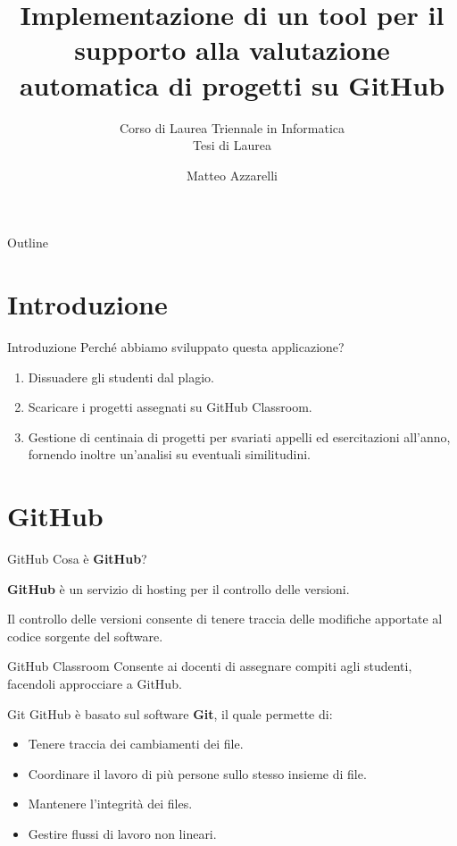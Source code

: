 \documentclass{beamer}
\title{Implementazione di un tool per il supporto alla valutazione automatica di progetti su GitHub}
\subtitle{\vspace{-0cm}Corso di Laurea Triennale in Informatica\\{\large Tesi di Laurea}}
\author{%
	Matteo Azzarelli}
\date{\vspace{2.5cm}\color{black}{\footnotesize{ANNO ACCADEMICO 2017/2018}}}
\begin{document}
	\maketitle

	\begin{frame}{Outline}
		\tableofcontents
	\end{frame}

	\section{Introduzione}
	
	\begin{frame}{Introduzione}
		Perché abbiamo sviluppato questa applicazione?
		\pause
		\begin{enumerate}[<+->]
			\item Dissuadere gli studenti dal plagio.
			\item Scaricare i progetti assegnati su GitHub Classroom.
			\item Gestione di centinaia di progetti per svariati appelli ed esercitazioni all'anno, fornendo inoltre un'analisi su eventuali similitudini.
			
		\end{enumerate}
	\end{frame}

	\section{GitHub}
	
	\begin{frame}{GitHub}
		Cosa è \textbf{GitHub}?
		
		\vspace{0.5cm}
		\textbf{GitHub} è un servizio di hosting per il controllo delle versioni. 
		
		\vspace{0.5cm}
		Il controllo delle versioni consente di tenere traccia delle modifiche apportate al codice sorgente del software.
		\pause
		
		\begin{alertblock}{GitHub Classroom}
			Consente ai docenti di assegnare compiti agli studenti, facendoli approcciare a GitHub.
		\end{alertblock}
	\end{frame}
	

	\begin{frame}{Git}
		GitHub è basato sul software \textbf{Git}, il quale permette di:
		\begin{itemize}[<+->]
			\item Tenere traccia dei cambiamenti dei file.
			\item Coordinare il lavoro di più persone sullo stesso insieme di file.
			\item Mantenere l'integrità dei files.
			\item Gestire flussi di lavoro non lineari.
		\end{itemize}
	\end{frame}
	
\end{document}
